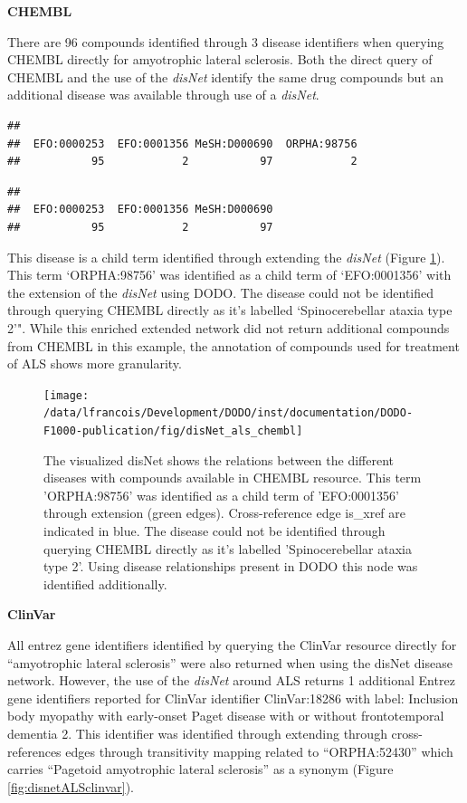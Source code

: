 \documentclass[9pt,a4paper,]{extarticle}
\begin{document}
\textbf{CHEMBL}

There are 96 compounds identified through 3 disease identifiers when querying CHEMBL directly for amyotrophic lateral sclerosis. Both the direct query of CHEMBL and the use of the \emph{disNet} identify the same drug compounds but an additional disease was available through use of a \emph{disNet}.

\begin{verbatim}
## 
##  EFO:0000253  EFO:0001356 MeSH:D000690  ORPHA:98756 
##           95            2           97            2
\end{verbatim}

\begin{verbatim}
## 
##  EFO:0000253  EFO:0001356 MeSH:D000690 
##           95            2           97
\end{verbatim}

This disease is a child term identified through extending the \emph{disNet} (Figure \ref{fig:disnetALSchembl}). This term `ORPHA:98756' was identified as a child term of `EFO:0001356' with the extension of the \emph{disNet} using DODO. The disease could not be identified through querying CHEMBL directly as it's labelled `Spinocerebellar ataxia type 2'". While this enriched extended network did not return additional compounds from CHEMBL in this example, the annotation of compounds used for treatment of ALS shows more granularity.

\begin{figure}

{\centering \texttt{[image: /data/lfrancois/Development/DODO/inst/documentation/DODO-F1000-publication/fig/disNet\_als\_chembl]} 

}

\caption{The visualized disNet shows the relations between the different diseases with compounds available in CHEMBL resource. This term 'ORPHA:98756' was identified as a child term of 'EFO:0001356' through extension (green edges). Cross-reference edge is\_xref are indicated in blue.  The disease could not be identified through querying CHEMBL directly as it's labelled 'Spinocerebellar ataxia type 2'. Using disease relationships present in DODO this node was identified additionally.}\label{fig:disnetALSchembl}
\end{figure}

\textbf{ClinVar}

All entrez gene identifiers identified by querying the ClinVar resource directly for ``amyotrophic lateral sclerosis'' were also returned when using the disNet disease network. However, the use of the \emph{disNet} around ALS returns 1 additional Entrez gene identifiers reported for ClinVar identifier ClinVar:18286 with label: Inclusion body myopathy with early-onset Paget disease with or without frontotemporal dementia 2. This identifier was identified through extending through cross-references edges through transitivity mapping related to ``ORPHA:52430'' which carries ``Pagetoid amyotrophic lateral sclerosis'' as a synonym (Figure \ref{fig:disnetALSclinvar}).
\end{document}
